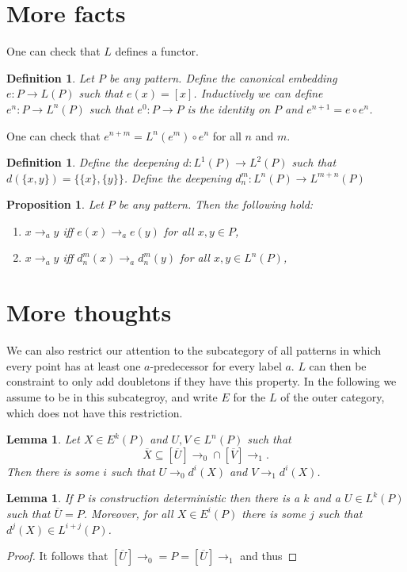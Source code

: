 \documentclass[a4paper]{article}
\renewcommand{\flat}[1]{\overline{#1}}
\newtheorem{lemma}[theorem]{Lemma}
\newtheorem{proposition}[theorem]{Proposition}
\newtheorem{definition}[theorem]{Definition}
\begin{document}
\section{More facts}

One can check that $L$ defines a functor.

\begin{definition}
 Let $P$ be any pattern. Define the \emph{canonical embedding} $e : P
\to L(P)$ such that $e(x) = [x]$. Inductively we can define $e^n : P \to
L^n(P)$ such that $e^0 : P \to P$ is the identity on $P$ and $e^{n + 1}
= e \circ e^n$.
\end{definition}

One can check that $e^{n + m} = L^n(e^m) \circ e^n$ for all $n$ and $m$.


\begin{definition}
 Define the \emph{deepening} $d : L^1(P) \to L^2(P)$ such that
$d(\{x,y\}) = \{\{x\},\{y\}\}$.
Define the \emph{deepening} $d^m_n : L^n(P) \to L^{m +
n}(P)$
\end{definition}

\begin{proposition}
Let $P$ be any pattern. Then the following hold:
\begin{enumerate}
 \item $x \rightarrow_a y$ iff $e(x) \rightarrow_a e(y)$ for all $x,y
\in P$,
 \item $x \rightarrow_a y$ iff $d^m_n(x) \rightarrow_a d^m_n(y)$ for all
$x,y \in L^n(P)$,
\end{enumerate}
\end{proposition}


\section{More thoughts}

We can also restrict our attention to the subcategory of all patterns in
which every point has at least one $a$-predecessor for every label $a$.
$L$ can then be constraint to only add doubletons if they have this
property. In the following we assume to be in this subcategroy, and
write $E$ for the $L$ of the outer category, which does not have this
restriction.

\begin{lemma}
 Let $X \in E^k(P)$ and $U,V \in L^n(P)$ such that
\[
 \flat{X} \subseteq [\flat{U}]{\rightarrow_0} \cap
[\flat{V}]{\rightarrow_1}.
\]
Then there is some $i$ such that $U \rightarrow_0 d^i(X)$ and $V
\rightarrow_1 d^i(X)$.
\end{lemma}

\begin{lemma}
 If $P$ is construction deterministic then there is a $k$ and a $U \in
L^k(P)$ such that $\flat{U} = P$. Moreover, for all $X \in E^i(P)$ there
is some $j$ such that $d^j(X) \in L^{i + j}(P)$.
\end{lemma}
\begin{proof}
 It follows that $[\flat{U}]{\rightarrow_0} = P =
[\flat{U}]{\rightarrow_1}$ and thus 
\end{proof}
\end{document}
